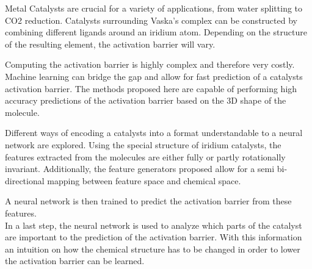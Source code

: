 
\Abstract

Metal Catalysts are crucial for a variety of applications, from water splitting to CO2 reduction. %
Catalysts surrounding Vaska's complex can be constructed by combining different ligands around an iridium atom.
Depending on the structure of the resulting element, the activation barrier will vary.

Computing the activation barrier is highly complex and therefore very costly. 
Machine learning can bridge the gap and allow for fast prediction of a catalysts activation barrier.
The methods proposed here are capable of performing high accuracy predictions of the activation barrier based on
the 3D shape of the molecule.

Different ways of encoding a catalysts into a format understandable to a neural network are explored.
Using the special structure of iridium catalysts, the features extracted from the molecules are either fully or partly rotationally invariant.
Additionally, the feature generators proposed allow for a semi bi-directional mapping between feature space and chemical space.

A neural network is then trained to predict the activation barrier from these features.
\\

In a last step, the neural network is used to analyze which parts of the catalyst are important to the prediction of the activation barrier.
With this information an intuition on how the chemical structure has to be changed in order to lower the activation barrier can be learned.
